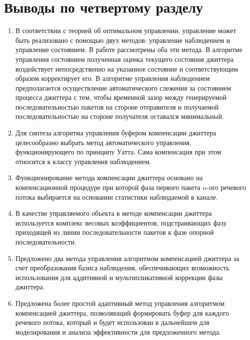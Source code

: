 \section{Выводы по четвертому разделу}
\begin{enumerate}

 \item
 В соответствии с теорией об оптимальном управлении, управление может быть реализовано с помощью двух методов:
 управление наблюдением и управление состоянием.
 В работе рассмотрены оба эти метода.
 В алгоритме управления состоянием полученная оценка текущего состояния джиттера воздействует непосредственно на указанное состояние и соответствующим образом корректирует его.
 В алгоритме управления наблюдением предполагается осуществление автоматического 
 слежения за состоянием процесса джиттера с тем, чтобы временной зазор между генерируемой 
 последовательностью пакетов на стороне отправителя и получаемой последовательностью на стороне получателя оставался минимальный.
 
  \item Для синтеза алгоритма управления буфером компенсации джиттера целесообразно выбрать метод автоматического управления, функционирующего по принципу Уатта. 
 Сама компенсация при этом относится к классу управления наблюдением.
 \item Функционирование метода компенсации джиттера основано на компенсационной процедуре при которой фаза первого пакета $n$-ого речевого потока выбирается на основании статистики наблюдаемой в канале.
 \item В качестве управляемого объекта в методе компенсации джиттера используется комплекс весовых коэффициентов, подстраивающих фазу приходящей из линии последовательности пакетов к фазе опорной последовательности.
 \item Предложено два метода управления алгоритмом компенсацией джиттера за счет преобразования базиса наблюдения, обеспечивающих возможность использования для аддитивной и мультипликативной коррекции фазы джиттера.
 \item Предложена более простой адаптивный метод управления алгоритмом компенсацией джиттера, позволяющий формировать буфер для каждого речевого потока, который и будет использован в дальнейшем для моделирования и анализа эффективности для предложенного метода.
\end{enumerate}
